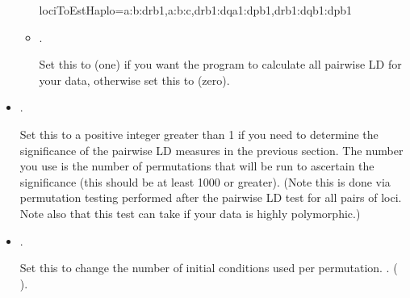 \documentclass[letterpaper,10pt,english,openany,oneside]{sphinxmanual}
\begin{document}
\begin{itemize}
\begin{itemize}
\begin{sphinxVerbatim}[commandchars=\\\{\}]
lociToEstHaplo=a:b:drb1,a:b:c,drb1:dqa1:dpb1,drb1:dqb1:dpb1
\end{sphinxVerbatim}

\item {} 
\sphinxAtStartPar
{}.

\sphinxAtStartPar
Set this to  (one) if you want the program to calculate all
pairwise LD for your data, otherwise set this to  (zero).

\end{itemize}

\end{itemize}
\label{\detokenize{docs/guide-chapter-usage:config-allpairwiseldwithpermu}}\begin{itemize}
\item {} 
\sphinxAtStartPar
{}.

\sphinxAtStartPar
Set this to a positive integer greater than 1 if you need to
determine the significance of the pairwise LD measures in the
previous section. The number you use is the number of permutations
that will be run to ascertain the significance (this should be at
least 1000 or greater). (Note this is done via permutation testing
performed after the pairwise LD test for all pairs of loci. Note
also that this test can take  if your data is highly
polymorphic.)

\item {} 
\sphinxAtStartPar
{}.

\sphinxAtStartPar
Set this to change the number of initial conditions used per
permutation. \sphinxstylestrong{{[}Default:}  \sphinxstylestrong{{]}}. (  ).

\end{itemize}
\end{document}
